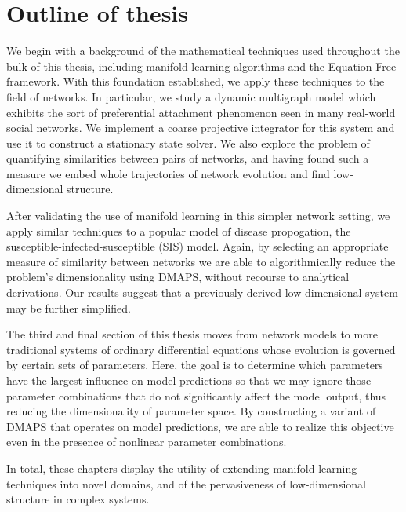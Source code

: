 \section{Outline of thesis}

We begin with a background of the mathematical techniques used
throughout the bulk of this thesis, including manifold learning
algorithms and the Equation Free framework. With this foundation
established, we apply these techniques to the field of networks. In
particular, we study a dynamic multigraph model which exhibits the
sort of preferential attachment phenomenon seen in many real-world
social networks. We implement a coarse projective integrator for this
system and use it to construct a stationary state solver. We also
explore the problem of quantifying similarities between pairs of
networks, and having found such a measure we embed whole trajectories
of network evolution and find low-dimensional structure.

After validating the use of manifold learning in this simpler network
setting, we apply similar techniques to a popular model of disease
propogation, the susceptible-infected-susceptible (SIS) model. Again,
by selecting an appropriate measure of similarity between networks we
are able to algorithmically reduce the problem's dimensionality using
DMAPS, without recourse to analytical derivations. Our results suggest
that a previously-derived low dimensional system may be further
simplified.

The third and final section of this thesis moves from network models
to more traditional systems of ordinary differential equations whose
evolution is governed by certain sets of parameters. Here, the goal is
to determine which parameters have the largest influence on model
predictions so that we may ignore those parameter combinations that do
not significantly affect the model output, thus reducing the
dimensionality of parameter space. By constructing a variant of DMAPS
that operates on model predictions, we are able to realize this
objective even in the presence of nonlinear parameter combinations.

In total, these chapters display the utility of extending manifold
learning techniques into novel domains, and of the pervasiveness of
low-dimensional structure in complex systems.

